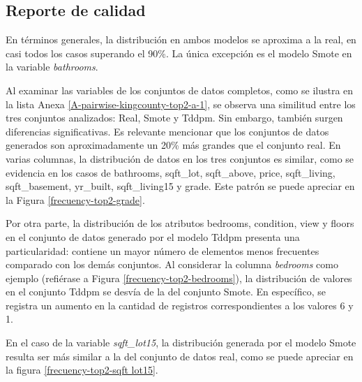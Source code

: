 
\newpage
\subsection{Reporte de calidad}
En términos generales, la distribución en ambos modelos se aproxima a la real, en casi todos los casos superando el 90\%. La única excepción es el modelo Smote en la variable \emph{bathrooms}.


\newpage
Al examinar las variables de los conjuntos de datos completos, como se ilustra en la lista Anexa \ref{A-pairwise-kingcounty-top2-a-1}, se observa una similitud entre los tres conjuntos analizados: Real, Smote y Tddpm. Sin embargo, también surgen diferencias significativas. Es relevante mencionar que los conjuntos de datos generados son aproximadamente un 20\% más grandes que el conjunto real. En varias columnas, la distribución de datos en los tres conjuntos es similar, como se evidencia en los casos de bathrooms, sqft\_lot, sqft\_above, price, sqft\_living, sqft\_basement, yr\_built, sqft\_living15 y grade. Este patrón se puede apreciar en la Figura \ref{frecuency-top2-grade}.



\newpage
Por otra parte, la distribución de los atributos bedrooms, condition, view y floors en el conjunto de datos generado por el modelo Tddpm presenta una particularidad: contiene un mayor número de elementos menos frecuentes comparado con los demás conjuntos. Al considerar la columna \emph{bedrooms} como ejemplo (refiérase a Figura \ref{frecuency-top2-bedrooms}), la distribución de valores en el conjunto Tddpm se desvía de la del conjunto Smote. En específico, se registra un aumento en la cantidad de registros correspondientes a los valores 6 y 1.



\newpage
En el caso de la variable \emph{sqft\_lot15}, la distribución generada por el modelo Smote resulta ser más similar a la del conjunto de datos real, como se puede apreciar en la figura \ref{frecuency-top2-sqft lot15}.


\newpage
